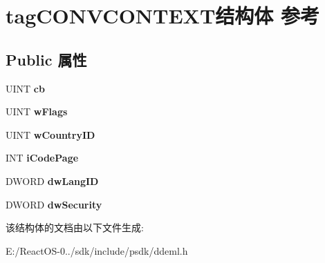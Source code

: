 \hypertarget{structtag_c_o_n_v_c_o_n_t_e_x_t}{}\section{tag\+C\+O\+N\+V\+C\+O\+N\+T\+E\+X\+T结构体 参考}
\label{structtag_c_o_n_v_c_o_n_t_e_x_t}
\subsection*{Public 属性}
\begin{DoxyCompactItemize}
\item 
\mbox{\label{structtag_c_o_n_v_c_o_n_t_e_x_t_a0ac6e6c6d547a9a74c85e6a07bbfd287}} 
U\+I\+NT {\bfseries cb}
\item 
\mbox{\label{structtag_c_o_n_v_c_o_n_t_e_x_t_af45bedf97f16b297ac98ff7838b8404f}} 
U\+I\+NT {\bfseries w\+Flags}
\item 
\mbox{\label{structtag_c_o_n_v_c_o_n_t_e_x_t_ae176fb4aee3df27888a411177290f85e}} 
U\+I\+NT {\bfseries w\+Country\+ID}
\item 
\mbox{\label{structtag_c_o_n_v_c_o_n_t_e_x_t_a777ab8056ff01e7b649f6d1b9dcaed14}} 
I\+NT {\bfseries i\+Code\+Page}
\item 
\mbox{\label{structtag_c_o_n_v_c_o_n_t_e_x_t_af90f1e3848cb5ee62819278fa95798a4}} 
D\+W\+O\+RD {\bfseries dw\+Lang\+ID}
\item 
\mbox{\label{structtag_c_o_n_v_c_o_n_t_e_x_t_aee294b8d8015d6176d6a20aa606cdfda}} 
D\+W\+O\+RD {\bfseries dw\+Security}
\end{DoxyCompactItemize}


该结构体的文档由以下文件生成\+:\begin{DoxyCompactItemize}
\item 
E\+:/\+React\+O\+S-\/0../sdk/include/psdk/ddeml.\+h\end{DoxyCompactItemize}

